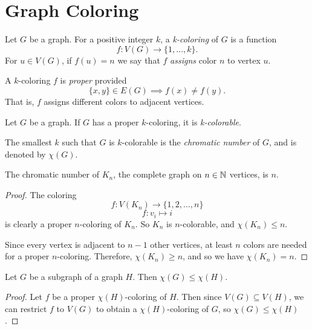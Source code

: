 \section{Graph Coloring}

\begin{defn}
    Let $G$ be a graph. For a positive integer $k$, a \emph{k-coloring} of $G$ is a function
    \[f: V(G) \to \{1, \ldots, k\}.\] For $u \in V(G)$, if $f(u) = n$ we say that $f$ \emph{assigns} color $n$ to vertex $u$.
\end{defn}

\begin{defn}
    A $k$-coloring $f$ is \emph{proper} provided
    \[\{x, y\} \in E(G) \implies f(x) \neq f(y).\]
    That is, $f$ assigns different colors to adjacent vertices.
\end{defn}

\begin{defn}
    Let $G$ be a graph. If $G$ has a proper $k$-coloring, it is \emph{k-colorable}.
\end{defn}

\begin{defn}
    The smallest $k$ such that $G$ is $k$-colorable is the \emph{chromatic number} of $G$, and is denoted by $\chi(G)$.
\end{defn}

\begin{prop}
    The chromatic number of $K_n$, the complete graph on $n \in \mathbb{N}$ vertices, is $n$.
\end{prop}

\begin{proof}
    The coloring
    \[f: V(K_n) \to \{1, 2, \ldots, n\}\]
    \[f: v_i \mapsto i\]
    is clearly a proper $n$-coloring of $K_n$. So $K_n$ is $n$-colorable, and $\chi(K_n) \leq n$.

    Since every vertex is adjacent to $n-1$ other vertices, at least $n$ colors are needed for a proper $n$-coloring. Therefore, $\chi(K_n) \geq n$, and so we have $\chi(K_n) = n$.
\end{proof}

\begin{prop}\label{subgraph-chromatic-number}
    Let $G$ be a subgraph of a graph $H$. Then $\chi(G) \leq \chi(H)$.
\end{prop}

\begin{proof}
    Let $f$ be a proper $\chi(H)$-coloring of $H$. Then since $V(G) \subseteq V(H)$, we can restrict $f$ to $V(G)$ to obtain a $\chi(H)$-coloring of $G$, so $\chi(G) \leq \chi(H)$.
\end{proof}

